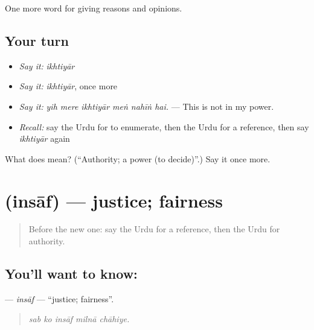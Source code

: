 \begin{grammarlens}[title={What you've built}]
One more word for giving reasons and opinions.
\end{grammarlens}

\subsection*{Your turn}
\begin{itemize}
\raggedright
  \item \emph{Say it:} \emph{ikhtiyār}
  \item \emph{Say it:} \emph{ikhtiyār}, once more
  \item \emph{Say it:} \emph{yih mere ikhtiyār meṅ nahīṅ hai.} — This is not in my power.
  \item \emph{Recall:} say the Urdu for to enumerate, then the Urdu for a reference, then say \emph{ikhtiyār} again
\end{itemize}

\begin{tcolorbox}[breakable,colback=teal!4,colframe=teal!35!black,title={Before you move on}]
What does  mean? (\textquotedblleft{}Authority; a power (to decide)\textquotedblright{}.) Say it once more.
\end{tcolorbox}
\section[\texorpdfstring{\ur{انصاف} (insāf)}{انصاف (insāf)}]{ (insāf) — justice; fairness}

\label{lesson:UR-C339-insaf}



\begin{quote}
Before the new one: say the Urdu for a reference, then the Urdu for authority.
\end{quote}

\subsection*{You'll want to know: }
\textbf{} — \emph{insāf} — \textquotedblleft{}justice; fairness\textquotedblright{}.

\begin{quote}
    
\end{quote}

\begin{quote}
\emph{sab ko insāf milnā chāhiye.}
\end{quote}

